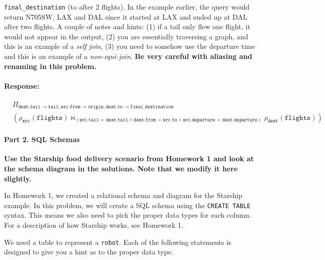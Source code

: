 \documentclass{report}
\renewcommand{\bf}[1]{\textbf{{#1}}}
\renewcommand{\tt}[1]{\texttt{{#1}}}
\newenvironment{response}{\begin{responseframe}\vspace{-10pt}\paragraph{Response:}}{\end{responseframe}}
\begin{document}
\begin{enumerate}[label=(\alph*)]
        \tt{final\_destination} (to after 2 flights). In the example earlier, the query would 
        return N705SW, LAX and DAL since it started at LAX and ended up at DAL after two flights. 
        A couple of notes and hints: (1) if a tail only flew one flight, it would not appear in the 
        output, (2) you are essentially traversing a graph, and this is an example of a 
        \emph{self join}, (3) you need to somehow use the departure time and this is an example of 
        a \emph{non-equi-join}. \bf{Be very careful with aliasing and renaming in this problem.}
        \begin{adjustwidth}{-7.7em}{-5.2em}
            \begin{response}
                \begin{align*}
                    &\Pi_{\tt{dest.tail} \to \tt{tail}, \tt{src.from} \to \tt{origin}, \tt{dest.to} \to \tt{final\_destination}} \\
                    &
                    (
                \rho_{\tt{src}}(\tt{flights}) 
                \bowtie_{(\tt{src.tail = dest.tail} 
                \land \tt{dest.from = src.to}
            \land \tt{src.departure < dest.departure})}
                \rho_{\tt{dest}}(\tt{flights})
                )
                \end{align*}
            \end{response}
        \end{adjustwidth}
\end{enumerate}

\paragraph{Part 2. SQL Schemas} \vspace{10pt} 

\bf{Use the Starship food delivery scenario from Homework 1 and look at the schema diagram in the 
solutions. Note that we modify it here slightly.} \vspace{10pt}

\noindent In Homework 1, we created a relational schema and diagram for the Starship example. In
this problem, we will create a SQL schema using the \tt{CREATE TABLE} syntax. This means we also need to
pick the proper data types for each column. For a description of how Starship works, see Homework 1.
\vspace{10pt}


\noindent We need a table to represent a \tt{robot}. Each of the following statements is designed to
give you a hint as to the proper data type.
\end{document}
